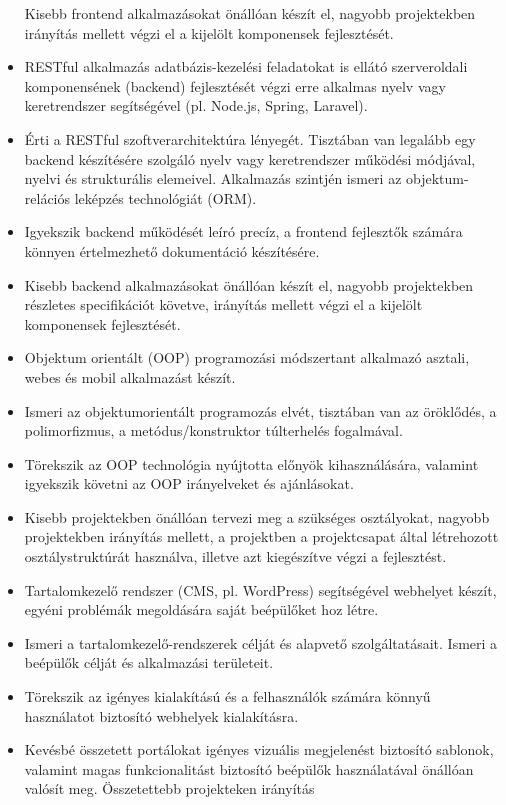 \begin{itemize}
  Kisebb frontend alkalmazásokat önállóan készít el, nagyobb
  projektekben irányítás mellett végzi el a kijelölt komponensek
  fejlesztését.
\item
  RESTful alkalmazás adatbázis-kezelési feladatokat is ellátó
  szerveroldali komponensének (backend) fejlesztését végzi erre alkalmas
  nyelv vagy keretrendszer segítségével (pl. Node.js, Spring, Laravel).
\item
  Érti a RESTful szoftverarchitektúra lényegét. Tisztában van legalább
  egy backend készítésére szolgáló nyelv vagy keretrendszer működési
  módjával, nyelvi és strukturális elemeivel. Alkalmazás szintjén ismeri
  az objektum-relációs leképzés technológiát (ORM).
\item
  Igyekszik backend működését leíró precíz, a frontend fejlesztők
  számára könnyen értelmezhető dokumentáció készítésére.
\item
  Kisebb backend alkalmazásokat önállóan készít el, nagyobb projektekben
  részletes specifikációt követve, irányítás mellett végzi el a kijelölt
  komponensek fejlesztését.
\item
  Objektum orientált (OOP) programozási módszertant alkalmazó asztali,
  webes és mobil alkalmazást készít.
\item
  Ismeri az objektumorientált programozás elvét, tisztában van az
  öröklődés, a polimorfizmus, a metódus/konstruktor túlterhelés
  fogalmával.
\item
  Törekszik az OOP technológia nyújtotta előnyök kihasználására,
  valamint igyekszik követni az OOP irányelveket és ajánlásokat.
\item
  Kisebb projektekben önállóan tervezi meg a szükséges osztályokat,
  nagyobb projektekben irányítás mellett, a projektben a projektcsapat
  által létrehozott osztálystruktúrát használva, illetve azt kiegészítve
  végzi a fejlesztést.
\item
  Tartalomkezelő rendszer (CMS, pl. WordPress) segítségével webhelyet
  készít, egyéni problémák megoldására saját beépülőket hoz létre.
\item
  Ismeri a tartalomkezelő-rendszerek célját és alapvető szolgáltatásait.
  Ismeri a beépülők célját és alkalmazási területeit.
\item
  Törekszik az igényes kialakítású és a felhasználók számára könnyű
  használatot biztosító webhelyek kialakításra.
\item
  Kevésbé összetett portálokat igényes vizuális megjelenést biztosító
  sablonok, valamint magas funkcionalitást biztosító beépülők
  használatával önállóan valósít meg. Összetettebb projekteken irányítás

\end{itemize}
